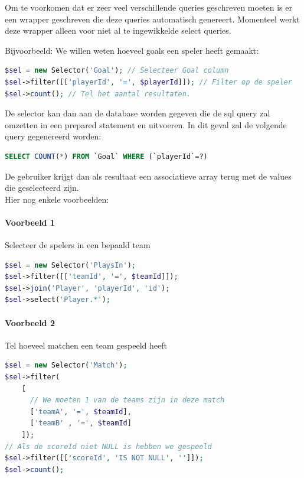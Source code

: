 \documentclass[11pt]{article}
\begin{document}
Om te voorkomen dat er zeer veel verschillende queries geschreven moeten is er een wrapper geschreven die
deze queries automatisch genereert. Momenteel werkt deze wrapper alleen voor niet al te ingewikkelde select queries.

Bijvoorbeeld: We willen weten hoeveel goals een speler heeft gemaakt:
\begin{framed}
\begin{lstlisting}[language=php]
$sel = new Selector('Goal'); // Selecteer Goal column
$sel->filter([['playerId', '=', $playerId]]); // Filter op de speler
$sel->count(); // Tel het aantal resultaten.
\end{lstlisting}
\end{framed}


De selector kan dan aan de database worden gegeven die de sql query zal omzetten in een prepared statement en uitvoeren.
In dit geval zal de volgende query gegenereerd worden:
\begin{framed}
\begin{lstlisting}[language=sql]
SELECT COUNT(*) FROM `Goal` WHERE (`playerId`=?)
\end{lstlisting}
\end{framed}

De gebruiker krijgt dan als resultaat een associatieve array terug met de values die geselecteerd zijn.\\

Hier nog enkele voorbeelden:

\paragraph{Voorbeeld 1}

Selecteer de spelers in een bepaald team
\begin{framed}
\begin{lstlisting}[language=php]
$sel = new Selector('PlaysIn');
$sel->filter([['teamId', '=', $teamId]]);
$sel->join('Player', 'playerId', 'id');
$sel->select('Player.*');
\end{lstlisting}
\end{framed}

\paragraph{Voorbeeld 2}

Tel hoeveel matchen een team gespeeld heeft
\begin{framed}
\begin{lstlisting}[language=php]
$sel = new Selector('Match');
$sel->filter(
    [
      // We moeten 1 van de teams zijn in deze match
      ['teamA', '=', $teamId],
      ['teamB' , '=', $teamId]
    ]);
// Als de scoreId niet NULL is hebben we gespeeld
$sel->filter([['scoreId', 'IS NOT NULL', '']]);
$sel->count();
\end{lstlisting}
\end{framed}
\end{document}
